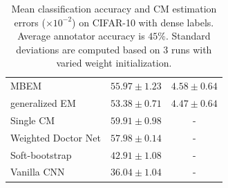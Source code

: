 \begin{table}
\begin{subtable}[t]{\linewidth}
\begin{tabular}{lcc}
            MBEM \cite{khetan2017learning}              & $55.97 \pm 1.23$ & $4.58\pm0.64$ \\
            generalized EM \cite{raykar2009supervised}  & $53.38 \pm 0.71$ & $4.47\pm0.64$  \\
            \midrule
            Single CM \cite{sukhbaatar2014training}  & $59.91 \pm 0.98$  & -   \\
            Weighted Doctor Net \cite{guan2017said}     & $57.98\pm0.14$ &  -  \\
            Soft-bootstrap \cite{reed2014training}      & $42.91\pm1.08$ & -    \\
            Vanilla CNN \cite{reed2014training}         & $36.04\pm1.04 $ & -    \\
        \hline
        \end{tabular}
    \end{subtable}
\caption{\small Mean classification accuracy and CM estimation errors ($\times 10^{-2}$) on CIFAR-10 with dense labels. Average annotator accuracy is $45\%$. Standard deviations are computed based on 3 runs with varied weight initialization.}
\label{tab:cifar10}
\end{table}

